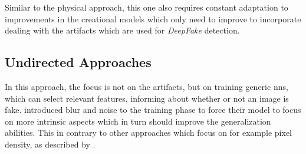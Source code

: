 \par
Similar to the physical approach, this one also requires constant adaptation to
improvements in the creational models which only need to improve to incorporate
dealing with the artifacts which are used for \textit{DeepFake} detection\cite{mirsky_creation_2020}.

\subsection{Undirected Approaches}
In this approach, the focus is not on the artifacts, but on training generic
\glspl{nn}, which can select relevant features, informing about whether or not
an image is fake. 
\textcite{xuan_generalization_2019} introduced blur and noise to the training phase
to force their model to focus on more intrinsic aspects which in turn should improve
the generalization abilities.
This in contrary to other approaches which focus on for example pixel density,
as described by \textcite{mirsky_creation_2020}.




